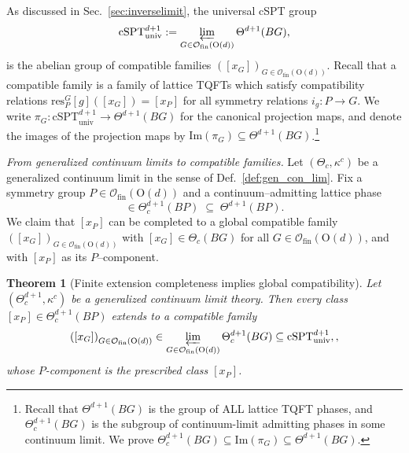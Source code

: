 \documentclass[aps,prx,reprint,superscriptaddress,twocolumn,amsmath,amssymb,amsfonts, nofootinbib]{revtex4-2}
\newcommand{\ofin}{\mathcal{O}_{\text{fin}}}
\newcommand{\res}{\text{res}}
\theoremstyle{apsstyle}
\newtheorem{theorem}{Theorem}[section]
\begin{document}
As discussed in Sec.~\ref{sec:inverselimit}, the universal cSPT group 
\begin{equation*}
\mathrm{cSPT}^{d+1}_{\mathrm{univ}}:=\varprojlim_{G\in\ofin(\mathrm{O}(d))}\Theta^{d+1}(BG),
\end{equation*}
is the abelian group of compatible families $\left([x_{G}]\right)_{G\in \ofin(\mathrm{O}(d))}.$ Recall that a compatible family is a family of lattice TQFTs which satisfy compatibility relations $\res^{G}_{P}[g]([x_{G}])=[x_{P}]$ for all symmetry relations $i_{g}: P\to G$. We write $\pi_{G}: \mathrm{cSPT}^{d+1}_{\mathrm{univ}} \to \Theta^{d+1}(BG)$ for the canonical projection maps, and denote the images of the projection maps by $\mathrm{Im}(\pi_{G})\subseteq \Theta^{d+1}(BG)$.\footnote{Recall that $\Theta^{d+1}(BG)$ is the group of ALL lattice TQFT phases, and $\Theta_{c}^{d+1}(BG)$ is the subgroup of continuum-limit admitting phases in some continuum limit. We prove $\Theta^{d+1}_{c}(BG)\subseteq \mathrm{Im}(\pi_{G})\subseteq \Theta^{d+1}(BG)$.}

\bigskip
\noindent \textit{From generalized continuum limits to compatible families.}
Let $(\Theta_{c},\kappa^{c})$ be a generalized continuum limit in the sense of Def.~\ref{def:gen_con_lim}. Fix a symmetry group $P\in\ofin(\mathrm{O}(d))$ and a continuum–admitting lattice phase
\begin{equation*}
    [x_{P}]\in\Theta^{d+1}_{c}(BP)\;\subseteq\;\Theta^{d+1}(BP).
\end{equation*}
We claim that $[x_{P}]$ can be completed to a global compatible family $\left([x_{G}]\right)_{G\in\ofin(\mathrm{O}(d))}$ with $[x_{G}]\in\Theta_{c}(BG)$ for all $G\in \ofin(\mathrm{O}(d))$, and with $[x_{P}]$ as its $P$–component.

\medskip

\begin{theorem}[Finite extension completeness implies global compatibility]
\label{thm:finite_to_global_compatibility} 
Let $(\Theta^{d+1}_{c},\kappa^{c})$ be a generalized continuum limit theory. Then every class $[x_P]\in\Theta^{d+1}_{c}(BP)$ extends to a compatible family
\begin{equation*}
\left([x_G]\right)_{G\in\ofin(\mathrm{O}(d))} \in \varprojlim_{G\in\ofin(\mathrm{O}(d))} \Theta^{d+1}_{c}(BG)\subseteq
\mathrm{cSPT}^{d+1}_{\mathrm{univ}},,
\end{equation*}
whose $P$-component is the prescribed class $[x_P]$.
\end{theorem}
\end{document}
